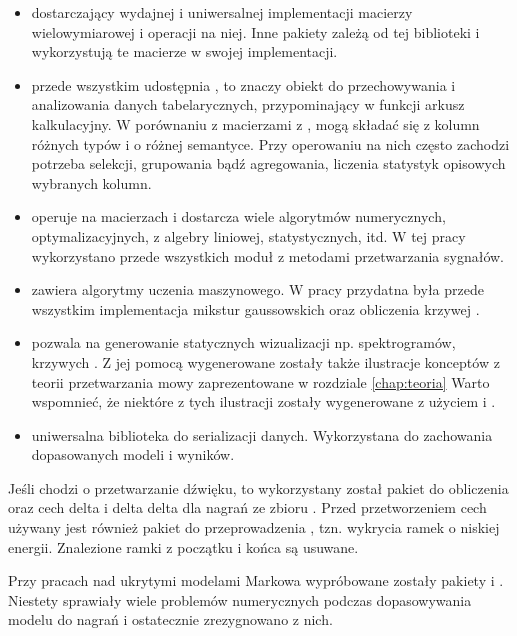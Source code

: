 \begin{itemize}
    \item {} dostarczający wydajnej i uniwersalnej implementacji macierzy wielowymiarowej i operacji na niej.
        Inne pakiety zależą od tej biblioteki i wykorzystują te macierze w swojej implementacji.
    \item {} przede wszystkim udostępnia , to znaczy obiekt do przechowywania i analizowania danych tabelarycznych, przypominający w funkcji arkusz kalkulacyjny. W porównaniu z macierzami z ,  mogą składać się z kolumn różnych typów i o różnej semantyce. Przy operowaniu na nich często zachodzi potrzeba selekcji, grupowania bądź agregowania, liczenia statystyk opisowych wybranych kolumn.
    \item {} operuje na macierzach  i dostarcza wiele algorytmów numerycznych, optymalizacyjnych, z algebry liniowej, statystycznych, itd. W tej pracy wykorzystano przede wszystkich moduł z metodami przetwarzania sygnałów.
    \item {} zawiera algorytmy uczenia maszynowego. W pracy przydatna była przede wszystkim implementacja mikstur gaussowskich oraz obliczenia krzywej .
    \item {} pozwala na generowanie statycznych wizualizacji np. spektrogramów, krzywych . Z jej pomocą wygenerowane zostały także ilustracje konceptów z teorii przetwarzania mowy zaprezentowane w rozdziale \ref{chap:teoria} Warto wspomnieć, że niektóre z tych ilustracji zostały wygenerowane z użyciem  i .
    \item {} uniwersalna biblioteka do serializacji danych. Wykorzystana do zachowania dopasowanych modeli i wyników.
\end{itemize}

Jeśli chodzi o przetwarzanie dźwięku, to wykorzystany został pakiet 
do obliczenia  oraz cech delta i delta delta dla nagrań ze zbioru .
Przed przetworzeniem cech używany jest również pakiet  do przeprowadzenia
, tzn. wykrycia ramek o niskiej energii.  Znalezione ramki z początku i końca są usuwane.

Przy pracach nad ukrytymi modelami Markowa wypróbowane zostały pakiety  i .
Niestety sprawiały wiele problemów numerycznych podczas dopasowywania modelu do nagrań i ostatecznie zrezygnowano z nich.

